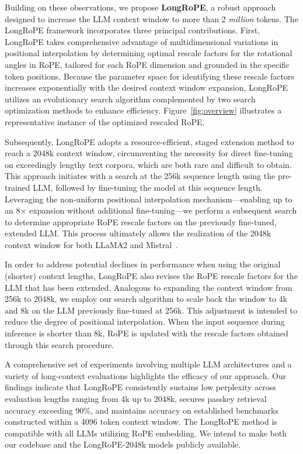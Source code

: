 Building on these observations, we propose \textbf{LongRoPE}, a robust approach designed to increase the LLM context window to more than 2 \emph{million} tokens. The LongRoPE framework incorporates three principal contributions. First, {LongRoPE} takes comprehensive advantage of multidimensional variations in positional interpolation by determining optimal rescale factors for the rotational angles in RoPE, tailored for each RoPE dimension and grounded in the specific token positions. Because the parameter space for identifying these rescale factors increases exponentially with the desired context window expansion, {LongRoPE} utilizes an evolutionary search algorithm complemented by two search optimization methods to enhance efficiency. Figure~\ref{fig:overview} illustrates a representative instance of the optimized rescaled RoPE.

Subsequently, {LongRoPE} adopts a resource-efficient, staged extension method to reach a 2048k context window, circumventing the necessity for direct fine-tuning on exceedingly lengthy text corpora, which are both rare and difficult to obtain. This approach initiates with a search at the 256k sequence length using the pre-trained LLM, followed by fine-tuning the model at this sequence length. Leveraging the non-uniform positional interpolation mechanism—enabling up to an 8$\times$ expansion without additional fine-tuning—we perform a subsequent search to determine appropriate RoPE rescale factors on the previously fine-tuned, extended LLM. This process ultimately allows the realization of the 2048k context window for both LLaMA2 and Mistral~\cite{mistral}.

In order to address potential declines in performance when using the original (shorter) context lengths, {LongRoPE} also revises the RoPE rescale factors for the LLM that has been extended. Analogous to expanding the context window from 256k to 2048k, we employ our search algorithm to scale back the window to 4k and 8k on the LLM previously fine-tuned at 256k. This adjustment is intended to reduce the degree of positional interpolation. When the input sequence during inference is shorter than 8k, RoPE is updated with the rescale factors obtained through this search procedure.

A comprehensive set of experiments involving multiple LLM architectures and a variety of long-context evaluations highlights the efficacy of our approach. Our findings indicate that LongRoPE consistently sustains low perplexity across evaluation lengths ranging from 4k up to 2048k, secures passkey retrieval accuracy exceeding 90\%, and maintains accuracy on established benchmarks constructed within a 4096 token context window. The LongRoPE method is compatible with all LLMs utilizing RoPE embedding. We intend to make both our codebase and the LongRoPE-2048k models publicly available.

